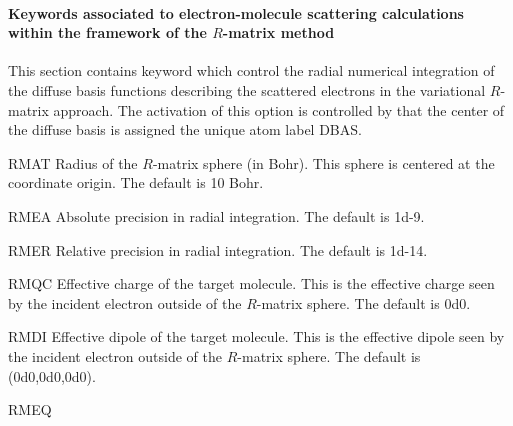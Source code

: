 \paragraph{Keywords associated to electron-molecule scattering calculations
within the framework of the $R$-matrix method}

This section contains keyword which control the radial numerical integration
of the diffuse basis functions describing the scattered electrons in the
variational $R$-matrix approach. The activation of this option is controlled
by that the center of the diffuse basis is assigned the unique atom label DBAS.

\begin{keywordlist}
\item[RMAT]
Radius of the $R$-matrix sphere (in Bohr). This sphere is centered at the
coordinate origin. The default is 10 Bohr.
\item[RMEA]
Absolute precision in radial integration.
The default is 1d-{}9.
\item[RMER]
Relative precision in radial integration.
The default is 1d-{}14.
\item[RMQC]
Effective charge of the target molecule.
This is the effective charge seen by the incident electron outside
of the $R$-matrix sphere. The default is 0d0.
\item[RMDI]
Effective dipole of the target molecule.
This is the effective dipole seen by the incident electron outside
of the $R$-matrix sphere. The default is (0d0,0d0,0d0).
\item[RMEQ]

\end{keywordlist}
